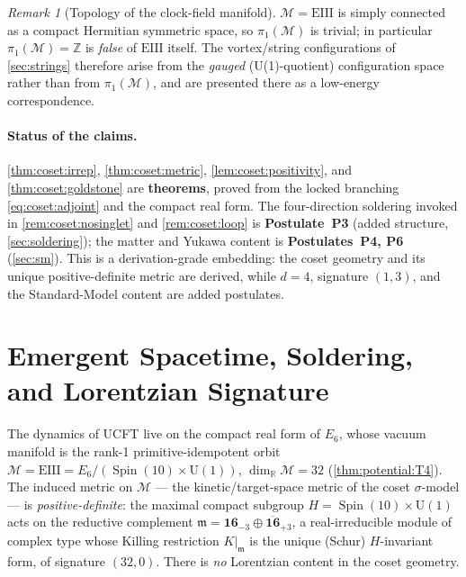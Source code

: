\documentclass[11pt]{article}
\theoremstyle{plain}
\theoremstyle{definition}
\theoremstyle{remark}
\newtheorem{remark}[theorem]{Remark}
\newcommand{\U}[1]{\mathrm{U}(#1)}
\newcommand{\Spin}{\operatorname{Spin}}
\newcommand{\Uone}{\U{1}}
\newcommand{\EIII}{\mathrm{EIII}}
\begin{document}
\begin{remark}[Topology of the clock-field manifold]\label{rem:coset:topology}
$\mathcal M = \mathrm{EIII}$ is simply connected as a compact Hermitian
symmetric space, so $\pi_{1}(\mathcal M)$ is trivial; in particular
$\pi_{1}(\mathcal M)=\mathbb Z$ is \emph{false} of $\mathrm{EIII}$ itself. The
vortex/string configurations of \autoref{sec:strings} therefore arise from the
\emph{gauged} (U(1)-quotient) configuration space rather than from
$\pi_{1}(\mathcal M)$, and are presented there as a low-energy correspondence.
\end{remark}

\paragraph{Status of the claims.}
\autoref{thm:coset:irrep}, \autoref{thm:coset:metric},
\autoref{lem:coset:positivity}, and \autoref{thm:coset:goldstone} are
\textbf{theorems}, proved from the locked branching \eqref{eq:coset:adjoint} and
the compact real form. The four-direction soldering invoked in
\autoref{rem:coset:nosinglet} and \autoref{rem:coset:loop} is
\textbf{Postulate~P3} (added structure, \autoref{sec:soldering}); the matter and
Yukawa content is \textbf{Postulates~P4, P6} (\autoref{sec:sm}). This is a
derivation-grade embedding: the coset geometry and its unique positive-definite
metric are derived, while $d=4$, signature $(1,3)$, and the Standard-Model
content are added postulates.


\section{Emergent Spacetime, Soldering, and Lorentzian Signature}
\label{sec:spacetime:main}
\label{sec:soldering:main}
\label{sec:sold:main}
\label{sec:soldering}

The dynamics of UCFT live on the compact real form of $E_6$, whose vacuum
manifold is the rank-1 primitive-idempotent orbit
$\mathcal M = \EIII = E_6/(\Spin(10)\times\Uone)$, $\dim_{\mathbb R}\mathcal M = 32$
(\autoref{thm:potential:T4}). The induced metric on $\mathcal M$ --- the
kinetic/target-space metric of the coset $\sigma$-model --- is
\emph{positive-definite}: the maximal compact subgroup
$H = \Spin(10)\times\Uone$ acts on the reductive complement
$\mathfrak m = \mathbf{16}_{-3}\oplus\overline{\mathbf{16}}_{+3}$, a real-irreducible
module of complex type whose Killing restriction $K|_{\mathfrak m}$ is the unique
(Schur) $H$-invariant form, of signature $(32,0)$. There is \emph{no} Lorentzian
content in the coset geometry.
\end{document}
